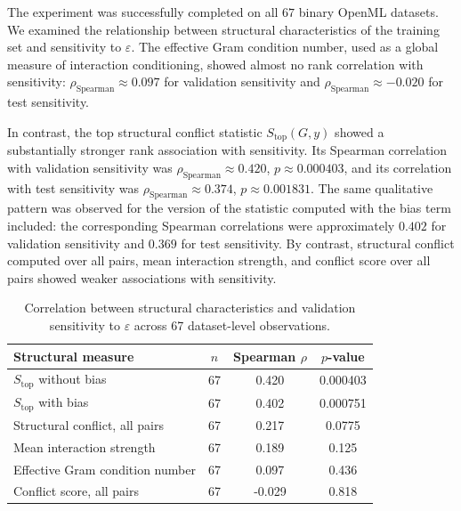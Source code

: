 \documentclass[a4paper,fleqn]{cas-sc}
\begin{document}
The experiment was successfully completed on all $67$ binary OpenML datasets. We examined the relationship between structural characteristics of the training set and sensitivity to $\varepsilon$. The effective Gram condition number, used as a global measure of interaction conditioning, showed almost no rank correlation with sensitivity: $\rho_{\mathrm{Spearman}}\approx 0.097$ for validation sensitivity and $\rho_{\mathrm{Spearman}}\approx -0.020$ for test sensitivity.

In contrast, the top structural conflict statistic $S_{\mathrm{top}}(G,y)$ showed a substantially stronger rank association with sensitivity. Its Spearman correlation with validation sensitivity was $\rho_{\mathrm{Spearman}}\approx 0.420$, $p\approx 0.000403$, and its correlation with test sensitivity was $\rho_{\mathrm{Spearman}}\approx 0.374$, $p\approx 0.001831$. The same qualitative pattern was observed for the version of the statistic computed with the bias term included: the corresponding Spearman correlations were approximately $0.402$ for validation sensitivity and $0.369$ for test sensitivity. By contrast, structural conflict computed over all pairs, mean interaction strength, and conflict score over all pairs showed weaker associations with sensitivity.

\begin{table}[h]
\centering
\caption{Correlation between structural characteristics and validation sensitivity to $\varepsilon$ across 67 dataset-level observations.}
\label{tab:eps-val-corr}
\begin{tabular}{lccc}
\hline
Structural measure & $n$ & Spearman $\rho$ & $p$-value \\
\hline
$S_{\mathrm{top}}$ without bias & 67 & 0.420 & 0.000403 \\
$S_{\mathrm{top}}$ with bias    & 67 & 0.402 & 0.000751 \\
Structural conflict, all pairs  & 67 & 0.217 & 0.0775 \\
Mean interaction strength       & 67 & 0.189 & 0.125 \\
Effective Gram condition number & 67 & 0.097 & 0.436 \\
Conflict score, all pairs       & 67 & -0.029 & 0.818 \\
\hline
\end{tabular}
\end{table}
\end{document}
